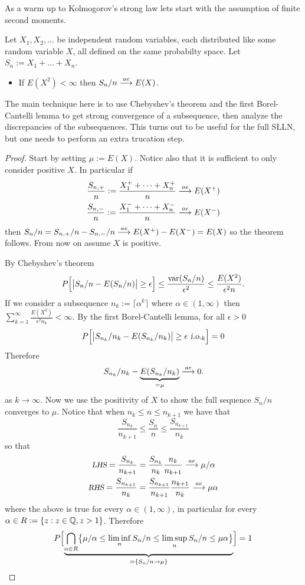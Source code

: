 As a warm up to Kolmogorov's strong law lets start with the assumption of finite second moments.
\begin{theorem}
\label{L2 SLLN}
Let $X_1, X_2,\ldots$ be independent random variables, each distributed like some random variable $X$, all defined on the same probabilty space. Let $S_n:= X_1+\ldots+ X_n$.
\begin{itemize}
\item If $E(X^2)<\infty$ then $S_n/n \overset{\small ae} \longrightarrow E(X)$.
\end{itemize}
\end{theorem}
The main technique here is to use Chebyshev's theorem and the first Borel-Cantelli lemma to get strong convergence of a subsequence, then analyze the discrepancies of the subsequences. This turns out to be useful for the full SLLN, but one needs to perform an extra trucation step.
\begin{proof}
Start by setting $\mu := E(X)$. Notice also that it is sufficient to only consider positive $X$. In particular if
\begin{align*}
\frac{S_{n,+}}{n}:= \frac{X_1^++ \cdots + X_n^+}{n} \overset{\small ae} \longrightarrow E(X^+) \\
\frac{S_{n,-}}{n}:= \frac{X_1^-+ \cdots + X_n^-}{n} \overset{\small ae} \longrightarrow E(X^-)
\end{align*}
then $S_n/n = S_{n,+}/n - S_{n,-}/n \overset{\small ae} \longrightarrow E(X^+) - E(X^-) = E(X)$ so the theorem follows. From now on assume $X$ is positive.

By Chebyshev's theorem
\begin{align*}
P\Bigl[\bigl| S_n/n - E(S_n/n)\bigr| \geq \epsilon \Bigr] \leq \frac{\text{var}(S_n/n)}{\epsilon^2}\leq \frac{E(X^2)}{\epsilon^2 n}.
\end{align*}
If we consider a subsequence $n_k:= \lceil \alpha^k \rceil$ where $\alpha \in (1,\infty)$ then $\sum_{k=1}^\infty \frac{E(X^2)}{\epsilon^2 n_k} < \infty$. By the first Borel-Cantelli lemma, for all $\epsilon>0$
\[  P\Bigl[\bigl| S_{n_k}/n_k - E(S_{n_k}/n_k)\bigr| \geq \epsilon {\,\,\text{\sl i.o.} }_k  \Bigr] =0 \]
Therefore
\[ S_{n_k}/n_k - \underbrace{E(S_{n_k}/n_k)}_{=\mu} \overset{\small ae} \longrightarrow 0. \]
as $k\rightarrow \infty$.
Now we use the positivity of $X$ to show the full sequence $S_n/n$ converges to $\mu$. Notice that when $n_k\leq n\leq n_{k+1}$ we have that
\begin{equation}
\label{lift from sub sequence}
\frac{S_{n_k}}{n_{k+1}}\leq \frac{S_n}{n} \leq \frac{S_{n_{k+1}}}{n_k}
\end{equation}
so that
\begin{align*}
\text{\sl \small LHS} = \frac{S_{n_k}}{n_{k+1}} & =  \frac{S_{n_k}}{n_{k}}\frac{n_k}{n_{k+1}} \overset{\small ae} \longrightarrow \mu/\alpha\\
\text{\sl \small RHS} = \frac{S_{n_{k+1}}}{n_k} & =  \frac{S_{n_{k+1}}}{n_{k+1}}\frac{n_{k+1}}{n_{k}} \overset{\small ae} \longrightarrow \mu\alpha
\end{align*}
where the above is true for every $\alpha\in (1,\infty)$, in particular for every $\alpha \in R:= \{z:z\in \Bbb Q, z>1\}$. Therefore
\[ P\Bigl[\underbrace{\bigcap_{\alpha \in R} \bigl\{ \mu/\alpha\leq \liminf_n  S_n/n  \leq \limsup_n S_n/n \leq \mu\alpha\bigr\}}_{=\{S_n/n \rightarrow \mu \}}\Bigr] = 1 \]
\end{proof}

